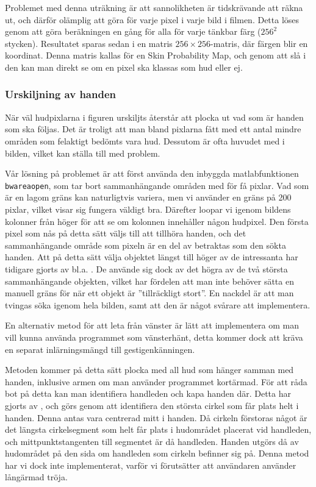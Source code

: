 \documentclass[../rapport_MVEX01-11-05]{subfiles}
\begin{document}
Problemet med denna uträkning är att sannolikheten är tidskrävande att
räkna ut, och därför olämplig att göra för varje pixel i varje bild i
filmen. Detta löses genom att göra beräkningen en gång för alla för
varje tänkbar färg ($256^2$ stycken). Resultatet sparas sedan i en
matris $256\times256$-matris, där färgen blir en koordinat. Denna matris
kallas för en Skin Probability Map, och genom att slå i den kan man
direkt se om en pixel ska klassas som hud eller ej.

\subsubsection{Urskiljning av handen}

När väl hudpixlarna i figuren urskiljts återstår att plocka ut
vad som är handen som ska följas. Det är troligt att man bland
pixlarna fått med ett antal mindre områden som felaktigt bedömts vara
hud. Dessutom är ofta huvudet med i bilden, vilket kan ställa till med
problem. 

Vår lösning på problemet är att först använda den inbyggda
matlabfunktionen \texttt{bwareaopen}, som tar bort sammanhängande 
områden med för få pixlar. Vad som är en lagom gräns kan naturligtvis
variera, men vi använder en gräns på 200 pixlar, vilket visar sig
fungera väldigt bra. Därefter loopar vi igenom bildens kolonner från
höger för att se om kolonnen innehåller någon hudpixel. Den första
pixel som nås på detta sätt väljs till att tillhöra handen, och det
sammanhängande område som pixeln är en del av betraktas som den sökta
handen. Att på detta sätt välja objektet längst till höger av de
intressanta har tidigare gjorts av bl.a. . De använde
sig dock av det högra av de två största sammanhängande objekten,
vilket har fördelen att man inte behöver sätta en manuell gräns för
när ett objekt är ''tillräckligt stort''. En nackdel är att man tvingas
söka igenom hela bilden, samt att den är något svårare att
implementera.

En alternativ metod för att leta från
vänster är lätt att implementera om man vill kunna använda programmet
som vänsterhänt, detta kommer dock att kräva en
separat inlärningsmängd till gestigenkänningen.

Metoden kommer på detta sätt plocka med all hud som hänger samman med
handen, inklusive armen om man använder programmet kortärmad. För att
råda bot på detta kan man identifiera handleden och kapa handen
där. Detta har gjorts av , och
görs genom att identifiera den största cirkel
som får plats helt i handen. Denna antas vara centrerad mitt i handen. Då
cirkeln förstoras något är det längsta cirkelsegment som helt får
plats i hudområdet placerat vid handleden, och mittpunktstangenten
till segmentet är då handleden. Handen utgörs då av hudområdet på den
sida om handleden som cirkeln befinner sig på. Denna metod har vi dock
inte implementerat, varför vi förutsätter att användaren använder
långärmad tröja. 
\end{document}
